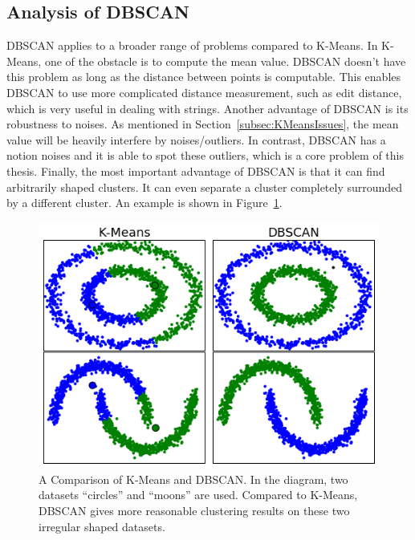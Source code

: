 \subsection{Analysis of DBSCAN}
\label{subsec:DBSCANalgorithm}
DBSCAN applies to a broader range of problems compared to K-Means. In K-Means, one of the obstacle is to compute the mean value. DBSCAN doesn't have this problem as long as the distance between points is computable. This enables DBSCAN to use more complicated distance measurement, such as edit distance, which is very useful in dealing with strings. Another advantage of DBSCAN is its robustness to noises. As mentioned in Section~\ref{subsec:KMeansIssues}, the mean value will be heavily interfere by noises/outliers. In contrast, DBSCAN has a notion noises and it is able to spot these outliers, which is a core problem of this thesis. Finally, the most important advantage of DBSCAN is that it can find arbitrarily shaped clusters. It can even separate a cluster completely surrounded by a different cluster. An example is shown in Figure~\ref{fig:KMeansDBSCAN}.

\begin{figure}
	\begin{center}
		\includegraphics[width=\textwidth]{images/KMeansDBSCAN.png}
		\caption{A Comparison of K-Means and DBSCAN. In the diagram, two datasets ``circles'' and ``moons'' are used. Compared to K-Means, DBSCAN gives more reasonable clustering results on these two irregular shaped datasets.}
		\label{fig:KMeansDBSCAN}
	\end{center}
\end{figure}

